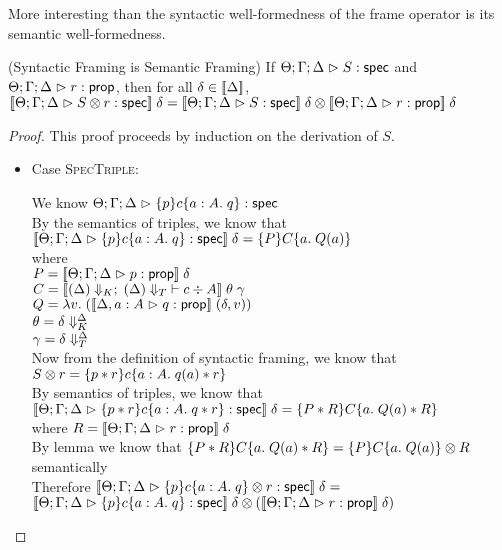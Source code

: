 More interesting than the syntactic well-formedness of the frame
operator is its semantic well-formedness. 

\begin{lemma*}{(Syntactic Framing is Semantic Framing)}
If $\judgeS{S}$ and $\judgeA{r}{\assert}$, then for all $\delta \in \interp{\Delta}$, 
$\interp{\judgeS{\Frame{S}{r}}}\;\delta = 
\Frame{\interp{\judgeS{S}}\;\delta}{\interp{\judgeA{r}{\assert}}\;\delta}$ \\
\end{lemma*}

\begin{proof}
  This proof proceeds by induction on the derivation of $S$. 

  \begin{itemize}
  \item Case \textsc{SpecTriple}: 
    \begin{tabbedproof}
      \oo We know $\judgeS{\spec{p}{c}{a:A}{q}}$ \\
      \oo By the semantics of triples, we know that 
          $\interp{\judgeS{\spec{p}{c}{a:A}{q}}}\;\delta = \spec{P}{C}{a}{Q(a)}$ \\ 
      \ox where \\
      \oox $P = \interp{\judgeA{p}{\assert}}\;\delta$ \\
      \oox $C = \interp{\judgeC[\restrictkind{\Delta}]{\restricttype{\Delta}}{c}{A}}\;\theta\;\gamma$ \\
      \oox $Q = \semfun{v}{(\interp{\judgeA[\Delta, a:A]{q}{\assert}}\;(\delta, v))}$ \\
      \oox $\theta = \restricttyenv{\Delta}{\delta}$ \\
      \oox $\gamma = \restrictvals{\Delta}{\delta}$ \\
      \oo Now from the definition of syntactic framing, we know that $\Frame{S}{r} = \spec{p * r}{c}{a:A}{q(a) * r}$ \\
      \oo By semantics of triples, we know that \\
      \oox $\interp{\judgeS{\spec{p * r}{c}{a:A}{q * r}}}\;\delta = \spec{P * R}{C}{a}{Q(a) * R}$ \\ 
      \ox where $R = \interp{\judgeA{r}{\assert}}\;\delta$ \\
      \oo By lemma we know that $\spec{P * R}{C}{a}{Q(a) * R} = \Frame{\spec{P}{C}{a}{Q(a)}}{R}$ 
          semantically \\
      \oo Therefore $\interp{\judgeS{\Frame{\spec{p}{c}{a:A}{q}}{r}}}\;\delta = $ \\
      \oox $\Frame{\interp{\judgeS{\spec{p}{c}{a:A}{q}}}\;\delta}{(\interp{\judgeA{r}{\assert}}\;\delta)}$
    \end{tabbedproof}


\end{itemize}
\end{proof}
